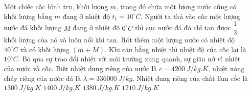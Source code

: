 \begin{vidu} 
	Một chiếc cốc hình trụ, khối lượng $m$, trong đó chứa một lượng nước cũng có khối lượng bằng $m$ đang ở nhiệt độ $t_1=10^\circ C$. Người ta thả vào cốc một lượng nước đá khối lượng $M$ đang ở nhiệt độ $0^\circ C$ thì cục nước đá đó chỉ tan được $\dfrac{1}{3}$ khối lượng của nó và luôn nổi khi tan. Rót thêm một lượng nước có nhiệt độ $40^\circ C$ và có khối lượng $(m+M)$. Khi cân bằng nhiệt thì nhiệt độ của cốc lại là $10^\circ C$. Bỏ qua sự trao đổi nhiệt với môi trường xung quanh, sự giãn nở vì nhiệt của nước và cốc. Biết nhiệt dung riêng của nước là $c=4200 \ J /kg.K$, nhiệt nóng chảy riêng của nước đá là $\lambda=336000 \ J /kg$. Nhiệt dung riêng của chất làm cốc là 
	\choice
	{$1300 \ J / kg . K$}
	{\True $1400 \ J / kg . K$}
	{$1380 \ J / kg . K$}
	{$1210 \ J / kg . K$}
	
\end{vidu}